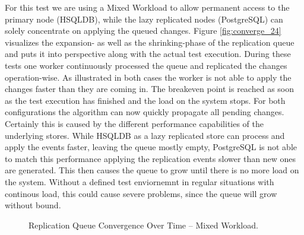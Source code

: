 
For this test we are using a Mixed Workload to allow permanent access to the primary node (HSQLDB), while the lazy replicated nodes (PostgreSQL) can solely concentrate on applying the queued changes.
Figure \ref{fig:converge_24} visualizes the expansion- as well as the shrinking-phase of the replication queue
and puts it into perspective along with the actual test execution. During these tests one worker continuously processed the queue and replicated 
the changes operation-wise. As illustrated in both cases the worker is not able to apply the changes faster than they are coming in.
The breakeven point is reached as soon as the test execution has finished and the load on the system stops. For both configurations the algorithm can now quickly propagate all pending
changes.
Certainly this is caused by the different performance capabilities of the underlying stores. 
While HSQLDB as a lazy replicated store can process and apply the events faster, 
leaving the queue mostly empty, PostgreSQL is not able to match this performance applying the replication events slower than new ones
are generated. This then causes the queue to grow until there is no more load on the system.
Without a defined test enviornemnt in regular situations with continous load, this could cause severe problems,
since the queue will grow without bound.

\begin{figure}[t] 
    \centering 
    \caption{Replication Queue Convergence Over Time -- Mixed Workload.}
    \label{fig:converge24}
\end{figure}


